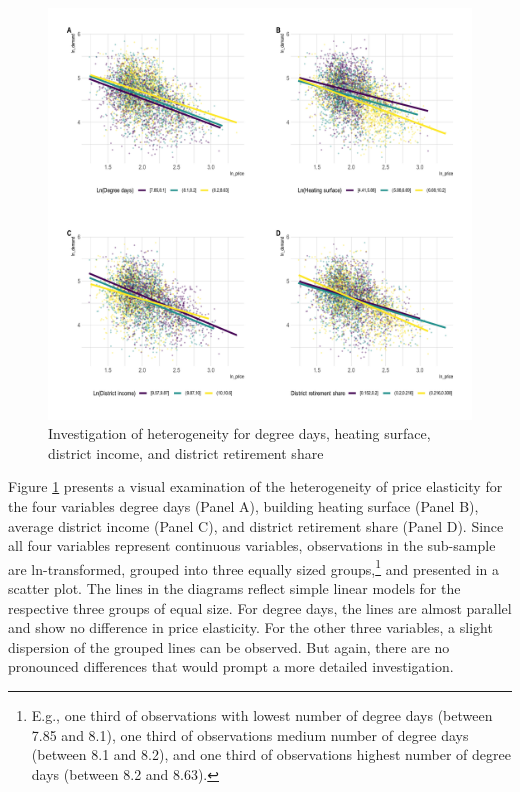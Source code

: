 \documentclass[12pt,twoside]{reedthesis}
\begin{document}
\newpage
\begin{figure}

{\centering \includegraphics[width=0.95\linewidth]{figure/other_vars_heterogeneity_plot} 

}

\caption{Investigation of heterogeneity for degree days, heating surface, district income, and district retirement share}\label{fig:heterogeneity-other-vars-plot}
\end{figure}
\noindent
Figure \ref{fig:heterogeneity-other-vars-plot} presents a visual examination of the heterogeneity of price elasticity for the four variables degree days (Panel A), building heating surface (Panel B), average district income (Panel C), and district retirement share (Panel D). Since all four variables represent continuous variables, observations in the sub-sample are ln-transformed, grouped into three equally sized groups,\footnote{E.g., one third of observations with lowest number of degree days (between 7.85 and 8.1), one third of observations medium number of degree days (between 8.1 and 8.2), and one third of observations highest number of degree days (between 8.2 and 8.63).} and presented in a scatter plot. The lines in the diagrams reflect simple linear models for the respective three groups of equal size. For degree days, the lines are almost parallel and show no difference in price elasticity. For the other three variables, a slight dispersion of the grouped lines can be observed. But again, there are no pronounced differences that would prompt a more detailed investigation.
\end{document}
